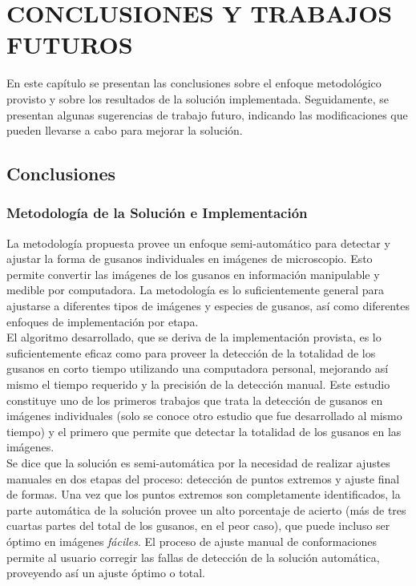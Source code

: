 \thispagestyle{empty}
\cleardoublepage
\chapter{CONCLUSIONES Y TRABAJOS FUTUROS}

En este cap\'itulo se presentan las conclusiones sobre el enfoque 
metodol\'ogico provisto y sobre los resultados
de la soluci\'on implementada.
Seguidamente, se presentan algunas sugerencias de
trabajo futuro, indicando las modificaciones que pueden llevarse 
a cabo para mejorar la soluci\'on.

\section{Conclusiones}

\subsection*{Metodolog\'ia de la Soluci\'on e Implementaci\'on}

La metodolog\'ia propuesta provee un enfoque semi-autom\'atico para 
detectar y ajustar la forma de gusanos individuales en im\'agenes
de microscopio. Esto permite convertir las im\'agenes de los gusanos
en informaci\'on manipulable y medible por computadora. La metodolog\'ia
es lo suficientemente general para ajustarse 
a diferentes tipos de im\'agenes y especies de gusanos, as\'i como
diferentes enfoques de implementaci\'on por etapa. \\
El algoritmo desarrollado, que se deriva de la implementaci\'on provista,
es lo suficientemente eficaz como para proveer la detecci\'on de 
la totalidad de los gusanos en corto tiempo utilizando una computadora
personal, mejorando as\'i mismo el tiempo requerido y la precisi\'on
de la detecci\'on manual.
Este estudio constituye uno de los primeros trabajos que trata la detecci\'on de gusanos
en im\'agenes individuales (solo se conoce otro estudio que fue 
desarrollado al mismo tiempo) y el primero que permite que detectar la totalidad de los
gusanos en las im\'agenes.\\

Se dice que la soluci\'on es semi-autom\'atica por la necesidad de 
realizar ajustes manuales en dos etapas del proceso: detecci\'on de
puntos extremos y ajuste final de formas. Una vez que los puntos extremos
son completamente identificados, la parte autom\'atica de la soluci\'on
provee un alto porcentaje de acierto (m\'as de tres cuartas partes
del total de los gusanos, en el peor caso), que puede incluso ser 
\'optimo en im\'agenes \emph{f\'aciles}. El proceso de ajuste manual
de conformaciones permite al usuario corregir las fallas de detecci\'on de la
soluci\'on autom\'atica, proveyendo as\'i un ajuste \'optimo o total.\\


